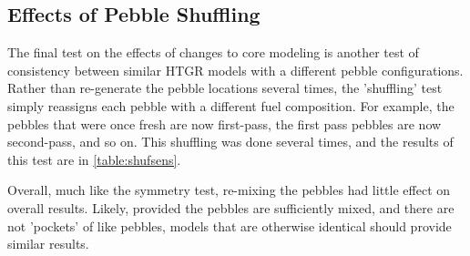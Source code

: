 \subsection{Effects of Pebble Shuffling}

The final test on the effects of changes to core modeling is another test of consistency between similar HTGR models with a different pebble configurations.  Rather than re-generate the pebble locations several times, the 'shuffling' test simply reassigns each pebble with a different fuel composition.  For example, the pebbles that were once fresh are now first-pass, the first pass pebbles are now second-pass, and so on.  This shuffling was done several times, and the results of this test are in \ref{table:shufsens}.



Overall, much like the symmetry test, re-mixing the pebbles had little effect on overall results.  Likely, provided the pebbles are sufficiently mixed, and there are not 'pockets' of like pebbles, models that are otherwise identical should provide similar results. 
